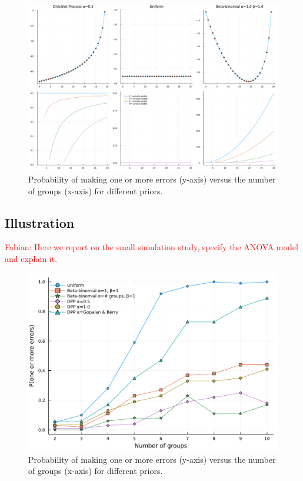 \documentclass[11pt,a4paper]{article}
\theoremstyle{definition} %
\theoremstyle{case}
\newcommand{\FD}[1]{\textcolor{red}{Fabian: #1 }}
\begin{document}
\begin{figure}
    \centering
    \includegraphics[width=\textwidth]{figures/prior_comparison_plot_2x4_without_log_without_betabinomial.pdf}
    \caption{Probability of making one or more errors (y-axis) versus the number of groups (x-axis) for different priors.}
    \label{fig:small_simulation}
\end{figure}

\subsection{Illustration} \label{sec:illustration}
\FD{Here we report on the small simulation study, specify the ANOVA model and explain it.}

\begin{figure}
    \centering
    \includegraphics[width=\textwidth]{figures/one_or_more_errors2.pdf}
    \caption{Probability of making one or more errors (y-axis) versus the number of groups (x-axis) for different priors.}
    \label{fig:small_simulation}
\end{figure}
\end{document}
